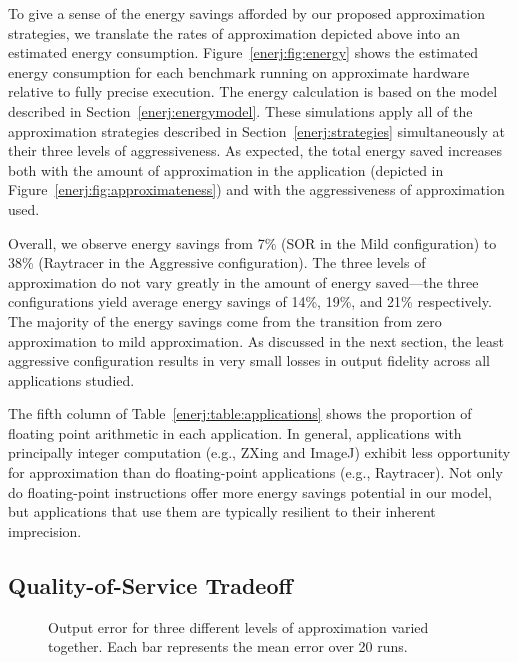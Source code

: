To give a sense of the energy savings afforded by our proposed
approximation strategies, we translate the rates of approximation depicted
above into an estimated energy consumption. Figure~\ref{enerj:fig:energy}
shows the estimated energy consumption for each benchmark running on
approximate hardware relative to fully precise execution.
The energy calculation is based on the model
described in Section~\ref{enerj:energymodel}. These simulations apply
all of the approximation strategies described in
Section~\ref{enerj:strategies} simultaneously at their three levels of
aggressiveness. As expected, the total energy saved increases both with
the amount of approximation in the application (depicted in
Figure~\ref{enerj:fig:approximateness}) and with
the aggressiveness of approximation used.

Overall, we observe energy savings from 7\% (SOR in the Mild
configuration) to 38\% (Raytracer in the Aggressive
configuration). The three levels of approximation do not vary greatly
in the amount of energy saved---the three configurations yield average
energy savings of 14\%, 19\%, and 21\% respectively. The majority of
the energy savings come from the transition from zero approximation to
mild approximation. As discussed in the next section, the least
aggressive configuration results in very small losses in output
fidelity across all applications studied.

The fifth column of Table~\ref{enerj:table:applications} shows the proportion of
floating point arithmetic in each application. In general, applications with
principally integer computation (e.g., ZXing and ImageJ) exhibit less
opportunity for approximation than do floating-point applications (e.g.,
Raytracer). Not only do floating-point instructions offer more energy savings
potential in our model, but applications that use them are typically resilient
to their inherent imprecision.

\subsection{Quality-of-Service Tradeoff}
\begin{figure}

\vspace{-4ex} %
\caption{Output error for three different levels of approximation varied
together. Each bar represents the mean error over 20 runs.}
\label{enerj:fig:sensitivity}
\end{figure}

